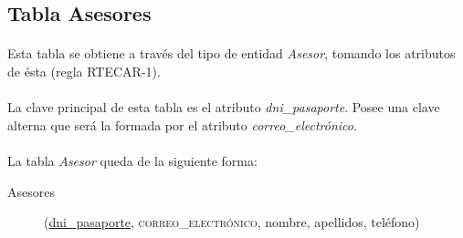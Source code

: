    \subsection{Tabla Asesores}

      \paragraph{}Esta tabla se obtiene a través del tipo de entidad
      \textit{Asesor}, tomando los atributos de ésta (regla RTECAR-1).

      \paragraph{}La clave principal de esta tabla es el atributo
      \textit{dni\_pasaporte}. Posee una clave alterna que será la formada por
      el atributo \textit{correo\_electrónico}.

      \paragraph{}La tabla \textit{Asesor} queda de la siguiente forma:

      \begin{description}
         \item[Asesores] \begin{flushleft}(\underline{dni\_pasaporte},
         \textsc{correo\_electrónico}, nombre, apellidos, teléfono)\end{flushleft}
      \end{description}
